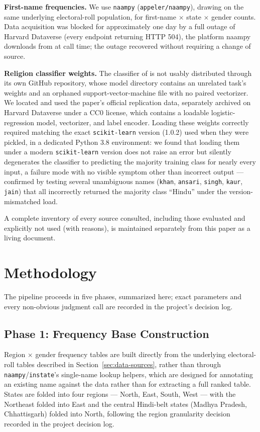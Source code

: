 \documentclass[11pt]{article}
\begin{document}
\textbf{First-name frequencies.} We use \texttt{naampy} (\texttt{appeler/naampy}), drawing on the same underlying electoral-roll population, for first-name $\times$ state $\times$ gender counts. Data acquisition was blocked for approximately one day by a full outage of Harvard Dataverse (every endpoint returning HTTP 504), the platform naampy downloads from at call time; the outage recovered without requiring a change of source.

\textbf{Religion classifier weights.} The classifier of \citet{chaturvedi2023} is not usably distributed through its own GitHub repository, whose model directory contains an unrelated task's weights and an orphaned support-vector-machine file with no paired vectorizer. We located and used the paper's official replication data, separately archived on Harvard Dataverse under a CC0 license, which contains a loadable logistic-regression model, vectorizer, and label encoder. Loading these weights correctly required matching the exact \texttt{scikit-learn} version (1.0.2) used when they were pickled, in a dedicated Python 3.8 environment: we found that loading them under a modern \texttt{scikit-learn} version does not raise an error but silently degenerates the classifier to predicting the majority training class for nearly every input, a failure mode with no visible symptom other than incorrect output --- confirmed by testing several unambiguous names (\texttt{khan}, \texttt{ansari}, \texttt{singh}, \texttt{kaur}, \texttt{jain}) that all incorrectly returned the majority class ``Hindu'' under the version-mismatched load.

A complete inventory of every source consulted, including those evaluated and explicitly not used (with reasons), is maintained separately from this paper as a living document.

\section{Methodology}
\label{sec:methodology}

The pipeline proceeds in five phases, summarized here; exact parameters and every non-obvious judgment call are recorded in the project's decision log.

\subsection{Phase 1: Frequency Base Construction}

Region $\times$ gender frequency tables are built directly from the underlying electoral-roll tables described in Section~\ref{sec:data-sources}, rather than through \texttt{naampy}/\texttt{instate}'s single-name lookup helpers, which are designed for annotating an existing name against the data rather than for extracting a full ranked table. States are folded into four regions --- North, East, South, West --- with the Northeast folded into East and the central Hindi-belt states (Madhya Pradesh, Chhattisgarh) folded into North, following the region granularity decision recorded in the project decision log.
\end{document}
